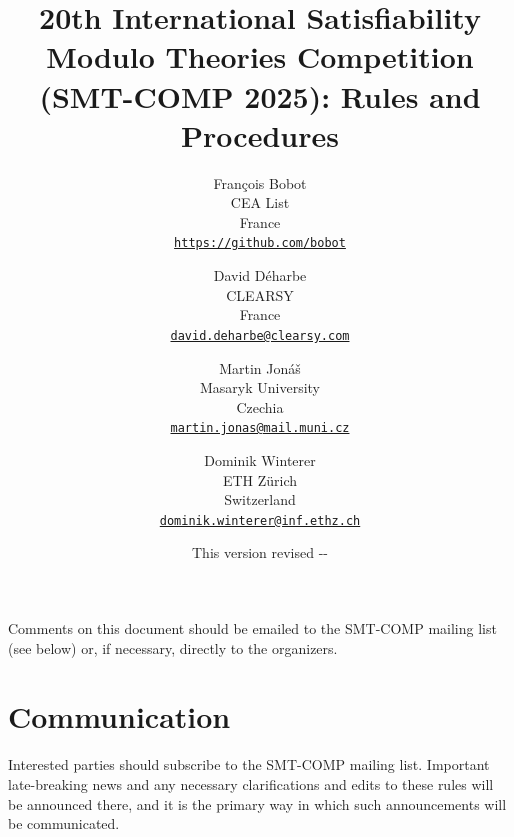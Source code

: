 \documentclass[12pt]{article}
\begin{document}
\date{\small This version revised \the\year-\the\month-\the\day}

\title{20th International Satisfiability Modulo Theories Competition
  (SMT-COMP 2025): Rules and Procedures}

\def\doauthor#1{{%
  \hsize.5\hsize \advance\hsize by-1cm %
  \def\\{\hss\egroup\hbox to\hsize\bgroup\strut\hss}%
  \vbox{\hbox to\hsize\bgroup\strut\hss#1\hss\egroup}}}%

\def\header#1{\medskip\noindent\textbf{#1}}

\author{%
Fran\c{c}ois Bobot\\
CEA List \\
France \\
{\small\href{mailto:Francois.BOBOT@cea.fr}{\texttt{https://github.com/bobot}}} \\
\and
David D\'{e}harbe\\
CLEARSY\\
France\\
{\small\href{mailto:david.deharbe@clearsy.com}{\texttt{david.deharbe@clearsy.com}}}\\
\and
Martin Jon\'{a}\v{s}\\
Masaryk University\\
Czechia\\
{\small\href{mailto:martin.jonas@mail.muni.cz}{\texttt{martin.jonas@mail.muni.cz}}}
\and
Dominik Winterer\\
ETH Z\"{u}rich\\
Switzerland\\
{\small\href{mailto:dominik.winterer@inf.ethz.ch}{\texttt{dominik.winterer@inf.ethz.ch}}}
}

\maketitle

\noindent Comments on this document should be emailed to the SMT-COMP
mailing list (see below) or, if necessary, directly to the organizers.


\section{Communication}

Interested parties should subscribe to the SMT-COMP mailing list.
Important late-breaking news and any necessary clarifications and
edits to these rules will be announced there, and it is the primary
way in which such announcements will be communicated.
\end{document}
